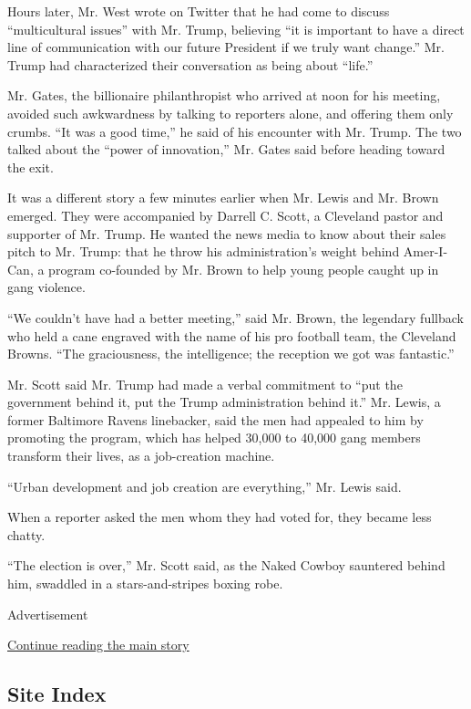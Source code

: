 Hours later, Mr. West wrote on Twitter that he had come to discuss
``multicultural issues'' with Mr. Trump, believing ``it is important to
have a direct line of communication with our future President if we
truly want change.'' Mr. Trump had characterized their conversation as
being about ``life.''

Mr. Gates, the billionaire philanthropist who arrived at noon for his
meeting, avoided such awkwardness by talking to reporters alone, and
offering them only crumbs. ``It was a good time,'' he said of his
encounter with Mr. Trump. The two talked about the ``power of
innovation,'' Mr. Gates said before heading toward the exit.

It was a different story a few minutes earlier when Mr. Lewis and Mr.
Brown emerged. They were accompanied by Darrell C. Scott, a Cleveland
pastor and supporter of Mr. Trump. He wanted the news media to know
about their sales pitch to Mr. Trump: that he throw his administration's
weight behind Amer-I-Can, a program co-founded by Mr. Brown to help
young people caught up in gang violence.

``We couldn't have had a better meeting,'' said Mr. Brown, the legendary
fullback who held a cane engraved with the name of his pro football
team, the Cleveland Browns. ``The graciousness, the intelligence; the
reception we got was fantastic.''

Mr. Scott said Mr. Trump had made a verbal commitment to ``put the
government behind it, put the Trump administration behind it.'' Mr.
Lewis, a former Baltimore Ravens linebacker, said the men had appealed
to him by promoting the program, which has helped 30,000 to 40,000 gang
members transform their lives, as a job-creation machine.

``Urban development and job creation are everything,'' Mr. Lewis said.

When a reporter asked the men whom they had voted for, they became less
chatty.

``The election is over,'' Mr. Scott said, as the Naked Cowboy sauntered
behind him, swaddled in a stars-and-stripes boxing robe.

Advertisement

\protect\hyperlink{after-bottom}{Continue reading the main story}

\hypertarget{site-index}{%
\subsection{Site Index}\label{site-index}}

